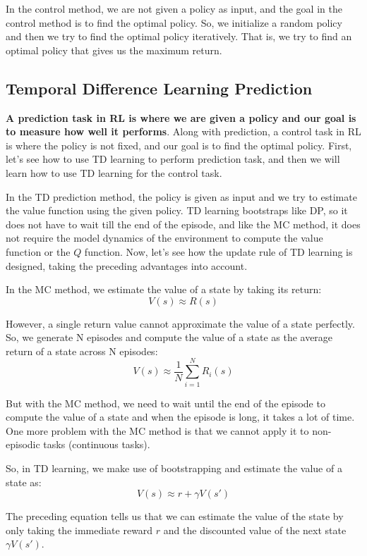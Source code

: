 In the control method, we are not given a policy as input, and the goal in 
the control method is to find the optimal policy. So, we initialize a 
random policy and then we try to find the optimal policy iteratively. That 
is, we try to find an optimal policy that gives us the maximum return.  


\subsection{Temporal Difference Learning Prediction}

{\bf A prediction task in RL is where we are given a policy and our goal is 
to measure how well it performs}. Along with prediction, a control task in 
RL is where the policy is not fixed, and our goal is to find the optimal 
policy. First, let's see how to use TD learning to perform prediction task, 
and then we will learn how to use TD learning for the control task. 

In the TD prediction method, the policy is given as input and we try to 
estimate the value function using the given policy. TD learning bootstraps 
like DP, so it does not have to wait till the end of the episode, and like 
the MC method, it does not require the model dynamics of the environment 
to compute the value function or the $Q$ function. Now, let's see how the 
update rule of TD learning is designed, taking the preceding advantages 
into account.

In the MC method, we estimate the value of a state by taking its return:  
$$
V(s) \approx R(s)
$$

However, a single return value cannot approximate the value of a state 
perfectly. So, we generate N episodes and compute the value of a state 
as the average return of a state across N episodes:
$$
V(s) \approx \frac{1}{N} \sum_{i=1}^{N} R_i(s)
$$

But with the MC method, we need to wait until the end of the episode to 
compute the value of a state and when the episode is long, it takes a 
lot of time. One more problem with the MC method is that we cannot apply 
it to non-episodic tasks (continuous tasks).  

So, in TD learning, we make use of bootstrapping and estimate the value 
of a state as:
\begin{equation}\label{bootstrapping_TD}
V(s) \approx r + \gamma V(s')
\end{equation}

The preceding equation tells us that we can estimate the value of the 
state by only taking the immediate reward $r$ and the discounted value 
of the next state $\gamma V(s')$.

